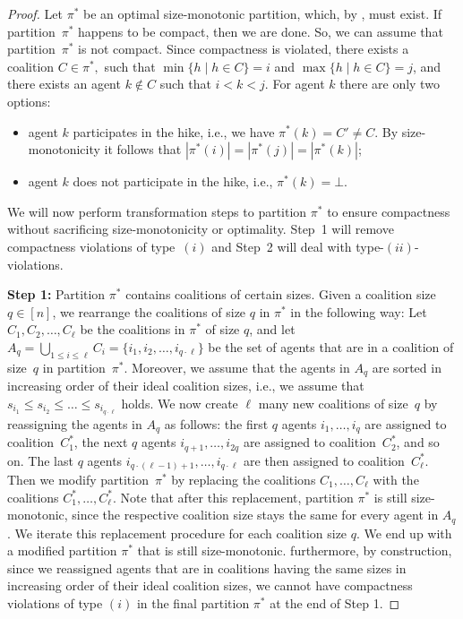 \documentclass[a4paper]{article}
\newcommand{\set}[1]{\{#1\}}
\begin{document}
\begin{proof}
Let $\pi^*$ be an optimal size-monotonic partition, which, by , must exist. If partition~$\pi^*$ happens to be compact, then we are done. So, we can assume that partition~$\pi^*$ is not compact. Since compactness is violated, there exists a coalition $C\in \pi^*,$ such that $\min\set{h \mid h \in C}=i$ and $\max\set{h \mid h\in C}=j$, and there exists an agent $k\not\in C$ such that $i<k<j$. For agent $k$ there are only two options:
\begin{itemize}
\item[(i)] agent $k$ participates in the hike, i.e., we have $\pi^*(k) = C' \neq C$. By size-monotonicity it follows that $|\pi^*(i)| = |\pi^*(j)| = |\pi^*(k)|$; 
\item[(ii)] agent $k$ does not participate in the hike, i.e., $\pi^*(k) = \bot$.
\end{itemize}
We will now perform transformation steps to partition $\pi^*$ to ensure compactness without sacrificing size-monotonicity or optimality. Step~1 will remove compactness violations of type~$(i)$ and Step~2 will deal with type-$(ii)$-violations.

\textbf{Step 1:} Partition $\pi^*$ contains coalitions of certain sizes.
Given a coalition size $q\in [n]$, we rearrange the coalitions of size $q$ in $\pi^*$ in the following way:
Let $C_1,C_2,\dots,C_\ell$ be the coalitions in $\pi^*$ 
of size $q$,
and let $A_q = \bigcup_{1\leq i \leq \ell}C_i = \{i_1,i_2,\dots,i_{q\cdot\ell}\}$ be the set of agents that are in a coalition of size~$q$ in partition~$\pi^*$. Moreover, we assume that the agents in $A_q$ are sorted in increasing order of their ideal coalition sizes, i.e., we assume that  $s_{i_1} \leq s_{i_2} \leq \dots \leq s_{i_{q\cdot\ell}}$ holds. We now create $\ell$ many new coalitions of size~$q$ by reassigning the agents in $A_q$ as follows: the first $q$ agents $i_1,\dots,i_q$ are assigned to coalition~$C_1^*$, the next $q$ agents $i_{q+1},\dots,i_{2q}$ are assigned to coalition~$C_2^*$, and so on. The last $q$ agents $i_{q\cdot(\ell-1)+1}, \dots, i_{q\cdot\ell}$ are then assigned to coalition~$C_\ell^*$. Then we modify partition~$\pi^*$ by replacing the coalitions $C_1,\dots,C_\ell$ with the coalitions $C_1^*,\dots,C_\ell^*$. Note that after this replacement, partition $\pi^*$ is still size-monotonic, since the respective coalition size stays the same for every agent in $A_q$. 
We iterate this replacement procedure for 
each coalition size $q$.
We end up with a modified partition $\pi^*$ that is still size-monotonic. furthermore, by construction,  since we reassigned agents that are in coalitions having the same sizes in increasing order of their ideal coalition sizes, we cannot have compactness violations of type $(i)$ in the final partition $\pi^*$ at the end of Step 1.   


\end{proof}
\end{document}
